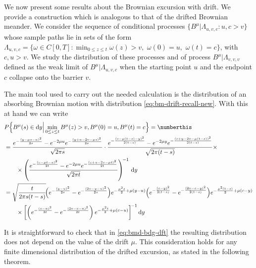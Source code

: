 
We now present some results about the Brownian excursion with drift. 
We provide a construction which  is analogous to that of the drifted Brownian meander. 
We consider the sequence of conditional processes $ \{ B^\mu | \Lambda_{u,v,c} : u,c >v \}_{} $ whose
sample paths lie in sets of the form 
$\Lambda_{u,v,c} = \{ \omega \in C[0,T]  :{\min_{ 0 \leq z \leq t } \omega(z) > v },\,\, \omega(0) = u,\,\, \omega(t) = c  \}$, with $ c,u > v $. We study the distribution of these processes and of process
$ B^\mu | \Lambda_{v,v,v} $ defined as the weak limit of $  B^\mu | \Lambda_{u,v,c} $ when the starting 
point $ u $ and the endpoint $ c $ collapse onto the barrier $ v $.

The main tool used to carry out the needed calculation is the distribution of an absorbing Brownian motion  
with distribution  \eqref{eq:bm-drift-recall-new}. With this at hand we can write
\begin{align*}
	&
	P \Big\{ 
	B^\mu(s) \in \mathrm d y \Big | \min_{ 0 \leq z \leq t } B^\mu(z) > v, B^\mu(0) = u, B^\mu(t) = c
	\Big\}
	 = \numberthis \label{eq:bmd-bdg-dft}\\
	&= 
		\frac{
			e^{- \frac{( y- \mu s -u)^2}{2s} } - 
			e^{ - 2 \mu u}
			e^{- \frac{( y + u - 2 v - \mu s )^2}{2s} }
		}{\sqrt{2\pi s}} \cdot 
		\frac{
			e^{- \frac{( c- \mu(t-s) - y)^2}{2(t-s)} } - 
			e^{ - 2 \mu y} 
			e^{- \frac{(c + y - 2 v  - \mu (t-s) )^2}{2(t-s)} }
		}{\sqrt{2\pi (t-s)}} 
	\times \\
	&
	\qquad \times 
	\left( 
		\frac{
			e^{- \frac{( c- \mu t -  u)^2}{2t} } -
			e^{-2\mu u } 
			e^{- \frac{( c + u - 2 v  - \mu t )^2}{2t} }
		}{\sqrt{2 \pi t}}
	\right)^{\!-1}	
	\,  \mathrm d y \\
	&=
	\sqrt{\frac{t}{2 \pi s(t-s)}}	\!
		\Big(
		e^{- \frac{( y- u)^2}{2s} } -
		e^{- \frac{( 2v - y   - u)^2}{2s} }
		\Big)
		e^{ - \frac{\mu^2 s}{2} + \mu (y-u)}
	\Big(
	e^{- \frac{( c -y)^2}{2(t-s)} } - 
	e^{- \frac{( 2v - c  - y)^2}{2(t-s)} }
	\Big)
	e^{- \frac{ \mu^2(t-s)}{2} + \mu(c-y) }
	\\
	& \qquad \times
	\left[ 
	\left( 
	e^{- \frac{( c - u)^2}{2t} } - 
	e^{- \frac{( 2v -c - u)^2}{2t} }
	\right)
	e^{ - \frac{\mu^2 t}{2} + \mu (c-u)}
	\right]^{\!-1}
	  \mathrm d y
\end{align*}

It is straightforward to check that in \eqref{eq:bmd-bdg-dft} the 
resulting distribution does not depend on the value of the drift $ \mu $. This consideration holds
for any finite dimensional distribution of the drifted excursion, as stated in the following theorem.

